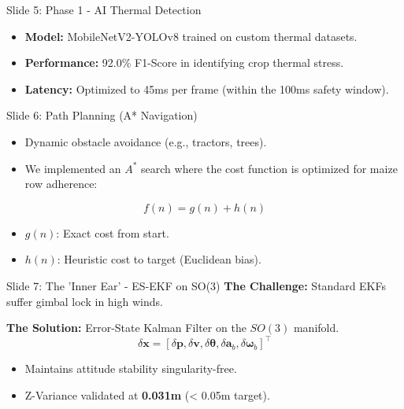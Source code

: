 \documentclass[aspectratio=169, xcolor=table]{beamer}
\begin{document}
\begin{frame}{Slide 5: Phase 1 - AI Thermal Detection}
    \begin{itemize}
        \item \textbf{Model:} MobileNetV2-YOLOv8 trained on custom thermal datasets.
        \item \textbf{Performance:} 92.0\% F1-Score in identifying crop thermal stress.
        \item \textbf{Latency:} Optimized to 45ms per frame (within the 100ms safety window).
    \end{itemize}
\end{frame}

\begin{frame}{Slide 6: Path Planning (A* Navigation)}
    \begin{itemize}
        \item Dynamic obstacle avoidance (e.g., tractors, trees).
        \item We implemented an $A^*$ search where the cost function is optimized for maize row adherence:
    \end{itemize}
    \begin{equation}
        f(n) = g(n) + h(n)
    \end{equation}
    \begin{itemize}
        \item \textit{$g(n)$}: Exact cost from start.
        \item \textit{$h(n)$}: Heuristic cost to target (Euclidean bias).
    \end{itemize}
\end{frame}

\begin{frame}{Slide 7: The 'Inner Ear' - ES-EKF on SO(3)}
    \textbf{The Challenge:} Standard EKFs suffer gimbal lock in high winds.
    
    \textbf{The Solution:} Error-State Kalman Filter on the $SO(3)$ manifold.
    \begin{equation}
        \delta \mathbf{x} = [\delta \mathbf{p}, \delta \mathbf{v}, \delta \boldsymbol{\theta}, \delta \mathbf{a}_b, \delta \boldsymbol{\omega}_b]^\top
    \end{equation}
    \begin{itemize}
        \item Maintains attitude stability singularity-free.
        \item Z-Variance validated at \textbf{0.031m} (< 0.05m target).
    \end{itemize}
\end{frame}
\end{document}
